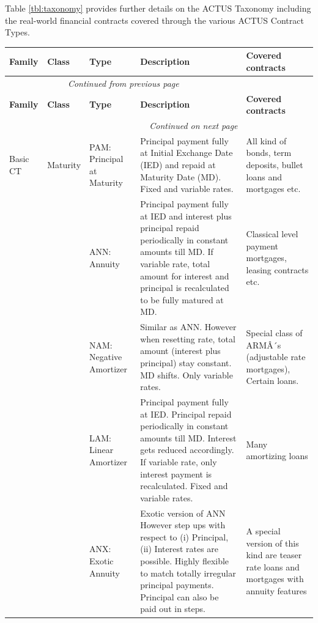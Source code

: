 \documentclass[9pt,oneside]{amsart}
\begin{document}
\begin{multicols}{2}
Table \ref{tbl:taxonomy} provides further details on the ACTUS Taxonomy including the real-world financial contracts covered through the various ACTUS Contract Types.



\end{multicols}

\begin{longtable}{| p{}p{}p{}p{}p{} |}
	\hline
	\textbf{Family} & \textbf{Class} & \textbf{Type} & \textbf{Description} & \textbf{Covered contracts} \\
	\hline
	\endfirsthead
	\multicolumn{4}{c}{\textit{Continued from previous page}} \\
	\hline
	\textbf{Family} & \textbf{Class} & \textbf{Type} & \textbf{Description} & \textbf{Covered contracts} \\
	\hline
	\endhead
	\hline \multicolumn{4}{r}{\textit{Continued on next page}} \\
	\endfoot
	\endlastfoot
	Basic CT & Maturity & PAM: Principal at Maturity & Principal payment fully at Initial Exchange Date (IED) and repaid at Maturity Date (MD). Fixed and variable rates. & All kind of bonds, term deposits, bullet loans and mortgages etc. \\
	\hline
	 & & ANN: Annuity & Principal payment fully at IED and interest plus principal repaid periodically in constant amounts till MD. If variable rate, total amount for interest and principal is recalculated to be fully matured at MD. & Classical level payment mortgages, leasing contracts etc. \\
	\hline 
	 & & NAM: Negative Amortizer & Similar as ANN. However when resetting rate, total amount (interest plus principal) stay constant. MD shifts. Only variable rates. & Special class of ARMÂ´s (adjustable rate mortgages), Certain loans. \\
	\hline 
	 & & LAM: Linear Amortizer & Principal payment fully at IED. Principal repaid periodically in constant amounts till MD. Interest gets reduced accordingly. If variable rate, only interest payment is recalculated. Fixed and variable rates. & Many amortizing loans \\
	\hline 
	 & & ANX: Exotic Annuity & Exotic version of ANN However step ups with respect to (i) Principal, (ii) Interest rates are possible. Highly flexible to match totally irregular principal payments. Principal can also be paid out in steps. & A special version of this kind are teaser rate loans and mortgages with annuity features \\

\end{longtable}
\end{document}

